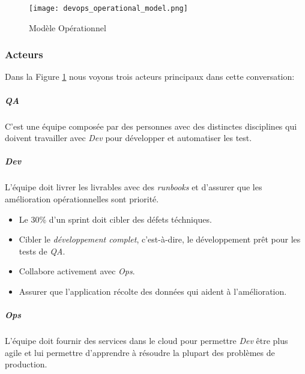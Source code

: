 \begin{figure}[!ht]
\centering
\texttt{[image: devops\_operational\_model.png]}
\caption{Modèle Opérationnel \cite{IsaacSacolick2016DrivingCulture}}
\label{fig:devops_operational_model}
\end{figure}


\subsubsection{Acteurs}
Dans la Figure \ref{fig:devops_operational_model} nous voyons trois acteurs principaux dans cette conversation:

\subparagraph{QA}
C'est une équipe composée par des personnes avec des distinctes disciplines qui doivent travailler avec \textit{Dev} pour développer et automatiser les test.
\subparagraph{Dev} L'équipe doit livrer les livrables avec des \emph{runbooks} et d'assurer que les amélioration opérationnelles sont priorité.
\begin{itemize}
  \item Le 30\% d'un sprint doit cibler des défets téchniques.
  \item Cibler le \emph{développement complet}, c'est-à-dire, le développement prêt pour les tests de \textit{QA}.
  \item Collabore activement avec \textit{Ops}.
  \item Assurer que l'application récolte des données qui aident à l'amélioration.
\end{itemize}
\subparagraph{Ops}
L'équipe doit fournir des services dans le cloud pour permettre \textit{Dev} être plus agile et lui permettre d'apprendre à résoudre la plupart des problèmes de production.
